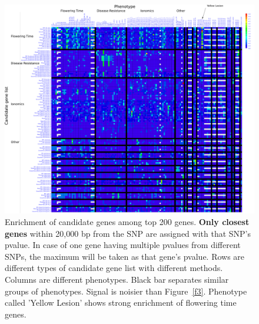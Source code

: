 \documentclass[a4paper,10pt]{article}
\begin{document}
\begin{figure}
  \includegraphics[width=1\textwidth]{figures/top_snp_test_call_method_17_f200_m20000_g_inkscape.png}
  \caption{Enrichment of candidate genes among top 200 genes. \textbf{Only closest genes} within 20,000 bp from the SNP are assigned with that SNP's pvalue. In case of one gene having multiple pvalues from different SNPs, the maximum will be taken as that gene's pvalue. Rows are different types of candidate gene list with different methods. Columns are different phenotypes. Black bar separates similar groups of phenotypes. Signal is noisier than Figure~\ref{f3}. Phenotype called 'Yellow Lesion' shows strong enrichment of flowering time genes.}\label{f4}
\end{figure}
\end{document}
